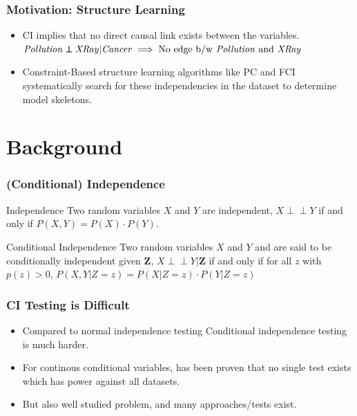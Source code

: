\documentclass{beamer}
\def\ci{\perp\!\!\!\!\!\perp}
\begin{document}
\begin{frame}
	\frametitle{Motivation: Structure Learning}
	\begin{itemize}
		\setlength\itemsep{1em}
		\item CI implies that no direct causal link exists between the variables. \newline
			$ \text{\emph{Pollution}} \ci \text{\emph{XRay}} | \text{\emph{Cancer}} \implies \text{No edge b/w \emph{Pollution} and \emph{XRay}} $

		\item Constraint-Based structure learning algorithms like PC
			and FCI systematically search for these independencies
			in the dataset to determine model skeletons.
	\end{itemize}
\end{frame}

\section{Background}
\begin{frame}
	\frametitle{(Conditional) Independence}
	\begin{block}{Independence}
		Two random variables $ X $ and $ Y $ are independent,
		$ X \ci Y $ if and only if $ P(X, Y) = P(X) \cdot P(Y) $.
	\end{block}
	\vspace{1em}

	\begin{block}{Conditional Independence}
		Two random variables $ X $ and $ Y $ and are said to be
		conditionally independent given $ \bm{Z} $, $ X \ci Y | \bm{Z}
		$ if and only if for all $ z $ with $ p(z) > 0 $, $ P(X, Y |
		Z=z) = P(X | Z=z) \cdot P(Y | Z=z) $
	\end{block}
\end{frame}

\begin{frame}
	\frametitle{CI Testing is Difficult}
	\begin{itemize}
		\setlength\itemsep{1em}
		\item Compared to normal independence testing Conditional independence testing is much harder.
		\item For continous conditional variables, has been proven that no single 
		      test exists which has power against all datasets. \footnotemark
		\item But also well studied problem, and many approaches/tests exist.
	\end{itemize}

\end{frame}
\end{document}
